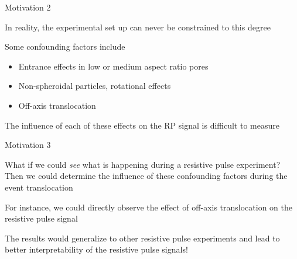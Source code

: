 

\begin{frame}[c]{Motivation 2}
	
	
	
	In reality, the experimental set up can never be constrained to this degree
	
	Some confounding factors include
	
	\begin{itemize}
		\item Entrance effects in low or medium aspect ratio pores
		\item Non-spheroidal particles, rotational effects
		\item Off-axis translocation
	\end{itemize}
	
	The influence of each of these effects on the RP signal is difficult to measure

\end{frame}





\begin{frame}[c]{Motivation 3}
	
	What if we could \textit{see} what is happening during a resistive pulse experiment? Then we could determine the influence of these confounding factors during the event translocation \\
	
	\vspace{.2in}
	
	For instance, we could directly observe the effect of off-axis translocation on the resistive pulse signal \\
	
	\vspace{.2in}
	
	The results would generalize to other resistive pulse experiments and lead to better interpretability of the resistive pulse signals! \\

\end{frame}



